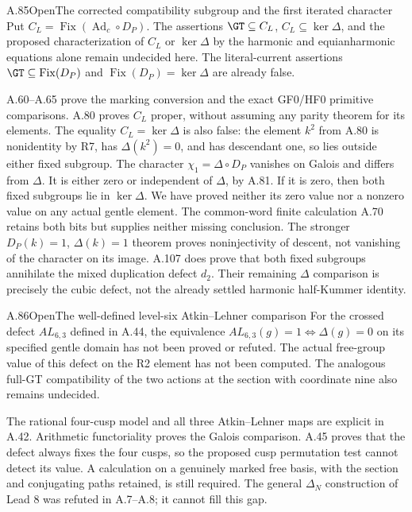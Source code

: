 \begin{statement}{A.85}{Open}{The corrected compatibility subgroup and the first iterated character}
Put $C_L=\operatorname{Fix}(\operatorname{Ad}_c\circ D_P)$.
The assertions $\GT\subseteq C_L$, $C_L\subseteq\ker\Delta$,
and the proposed characterization of $C_L$ or $\ker\Delta$
by the harmonic and equianharmonic equations alone remain
undecided here. The literal-current assertions
$\GT\subseteq\operatorname{Fix}(D_P)$ and
$\operatorname{Fix}(D_P)=\ker\Delta$ are already false.
\end{statement}
A.60--A.65 prove the marking conversion and the exact
GF0/HF0 primitive comparisons. A.80 proves $C_L$ proper,
without assuming any parity theorem for its elements.
The equality $C_L=\ker\Delta$ is also false: the element
$k^2$ from A.80 is nonidentity by R7, has $\Delta(k^2)=0$,
and has descendant one, so lies outside either fixed subgroup.
The character $\chi_1=\Delta\circ D_P$ vanishes on Galois
and differs from $\Delta$. It is either zero or independent
of $\Delta$, by A.81. If it is zero, then both fixed subgroups
lie in $\ker\Delta$. We have proved neither its zero value
nor a nonzero value on any actual gentle element.
The common-word finite calculation A.70 retains both bits
but supplies neither missing conclusion. The stronger
$D_P(k)=1$, $\Delta(k)=1$ theorem proves noninjectivity of
descent, not vanishing of the character on its image.
A.107 does prove that both fixed subgroups annihilate the mixed
duplication defect $d_2$. Their remaining $\Delta$ comparison
is precisely the cubic defect, not the already settled
harmonic half-Kummer identity.

\begin{statement}{A.86}{Open}{The well-defined level-six Atkin--Lehner comparison}
For the crossed defect $AL_{6,3}$ defined in A.44, the
equivalence $AL_{6,3}(g)=1\Longleftrightarrow\Delta(g)=0$
on its specified gentle domain has not been proved or refuted.
The actual free-group value of this defect on the R2 element
has not been computed. The analogous full-GT compatibility
of the two actions at the section with coordinate nine
also remains undecided.
\end{statement}
The rational four-cusp model and all three Atkin--Lehner maps
are explicit in A.42. Arithmetic functoriality proves the
Galois comparison. A.45 proves that the defect always fixes
the four cusps, so the proposed cusp permutation test cannot
detect its value. A calculation on a genuinely marked free
basis, with the section and conjugating paths retained,
is still required. The general $\Delta_N$ construction of
Lead 8 was refuted in A.7--A.8; it cannot fill this gap.


